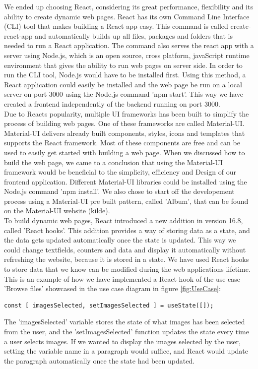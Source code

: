 We ended up choosing React, considering its great performance, flexibility and its ability to create dynamic web pages. React has its own Command Line Interface (CLI) tool that makes building a React app easy. This command is called create-react-app and automatically builds up all files, packages and folders that is needed to run a React application. The command also serves the react app with a server using Node.js, which is an open source, cross platform, javaScript runtime environment that gives the ability to run web pages on server side. In order to run the CLI tool, Node.js would have to be installed first. Using this method, a React application could easily be installed and the web page be run on a local server on port 3000 using the Node.js command 'npm start'. This way we have created a frontend independently of the backend running on port 3000.  \\

Due to Reacts popularity, multiple UI frameworks has been built to simplify the process of building web pages. One of these frameworks are called Material-UI. Material-UI delivers already built components, styles, icons and templates that supports the React framework. Most of these components are free and can be used to easily get started with building a web page. When we discussed how to build the web page, we came to a conclusion that using the Material-UI framework would be beneficial to the simplicity, efficiency and Design of our frontend application. Different Material-UI libraries could be installed using the Node.js command 'npm install'. We also chose to start off the developement process using a Material-UI pre built pattern, called 'Album', that can be found on the Material-UI website (kilde). \\

To build dynamic web pages, React introduced a new addition in version 16.8, called 'React hooks'. This addition provides a way of storing data as a state, and the data gets updated automatically once the state is updated. This way we could change textfields, counters and data and display it automatically without refreshing the website, because it is stored in a state. We have used React hooks to store data that we know can be modified during the web applications lifetime. This is an example of how we have implemented a React hook of the use case 'Browse files' showcased in the use case diagram in figure \ref{fig:UseCase}:
\begin{lstlisting}[caption=React hook implementation]
const [ imagesSelected, setImagesSelected ] = useState([]);
\end{lstlisting}
%
The 'imagesSelected' variable stores the state of what images has been selected from the user, and the 'setImagesSelected' function updates the state every time a user selects images. If we wanted to display the images selected by the user, setting the variable name in a paragraph would suffice, and React would update the paragraph automatically once the state had been updated.   \\






